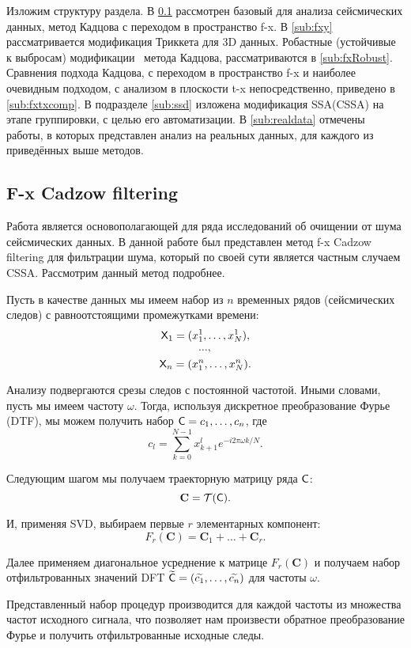 \documentclass[specialist,
               substylefile = spbu.rtx,
               subf,href,colorlinks=true, 12pt]{disser}
\begin{document}
Изложим структуру раздела. В \ref{sub:fx} рассмотрен базовый для анализа сейсмических данных, метод Кадцова с переходом в пространство f-x. В \ref{sub:fxy} рассматривается модификация Триккета для 3D данных. Робастные (устойчивые к выбросам) модификации  метода Кадцова, рассматриваются в \ref{sub:fxRobust}. Сравнения подхода Кадцова, с переходом в пространство f-x и наиболее очевидным подходом, с анализом в плоскости t-x непосредственно, приведено в \ref{sub:fxtxcomp}. В подразделе \ref{sub:ssd} изложена модификация SSA(CSSA) на этапе группировки, с целью его автоматизации. В \ref{sub:realdata} отмечены работы, в которых представлен анализ на реальных данных, для каждого из приведённых выше методов. 

\subsection{F-x Cadzow filtering}
\label{sub:fx}

Работа \cite{Cadzow88} является основополагающей для ряда исследований об очищении от шума сейсмических данных. В данной работе был представлен метод f-x Cadzow filtering для фильтрации шума, который по своей сути является частным случаем CSSA. Рассмотрим данный метод подробнее.

Пусть в качестве данных мы имеем набор из $n$ временных рядов (сейсмических следов) с равноотстоящими промежутками времени:
$$\textsf{X}_1 = (x^1_1, \ldots, x^1_{N}),$$
$$\ldots,$$
$$\textsf{X}_n = (x^n_1, \ldots, x^n_N).$$

Анализу подвергаются срезы следов с постоянной частотой. Иными словами, пусть мы имеем частоту $\omega$. Тогда, используя дискретное преобразование Фурье (DTF), мы можем получить набор $\textsf{C} = c_1, \ldots, c_n$, где
$$c_l = \sum_{k = 0}^{N-1} x^{l}_{k+1} e^{-i 2 \pi \omega k / N}.$$

Следующим шагом мы получаем траекторную матрицу ряда $\textsf{C}$:
$$\mathbf{C} = \mathcal{T}(\textsf{C}).$$

И, применяя SVD, выбираем первые $r$ элементарных компонент:
$$F_r(\mathbf{C}) = \mathbf{C}_1 + \ldots + \mathbf{C}_r.$$

Далее применяем диагональное усреднение к матрице $F_r(\mathbf{C})$ и получаем набор отфильтрованных значений DFT $\widetilde{\textsf{C}} = (\widetilde{c_1}, \ldots, \widetilde{c_n})$ для частоты $\omega$.

Представленный набор процедур производится для каждой частоты из множества частот исходного сигнала, что позволяет нам произвести обратное преобразование Фурье и получить отфильтрованные исходные следы.
\end{document}

